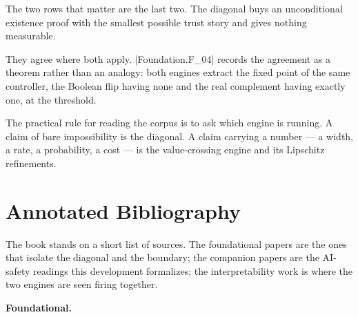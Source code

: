 \documentclass{memoir}
\begin{document}
The two rows that matter are the last two. The diagonal buys an unconditional
existence proof with the smallest possible trust story and gives nothing measurable.

They agree where both apply. \LeanVerb|Foundation.F_04| records the agreement as a theorem
rather than an analogy: both engines extract the fixed point of the same controller,
the Boolean flip having none and the real complement having exactly one, at the
threshold.

The practical rule for reading the corpus is to ask which engine is running. A claim
of bare impossibility is the diagonal. A claim carrying a number — a width, a rate,
a probability, a cost — is the value-crossing engine and its Lipschitz refinements.



\section{Annotated Bibliography}\label{Two--Schemas--of--Impossibility-005F-005F-005F--Machine--Checked--Limits--of--Trustworthy--Machine--Learning-005F-005F-005F--and--Why--They--Tighten--with--Capability----Appendices----Annotated--Bibliography}

The book stands on a short list of sources. The foundational papers are the ones
that isolate the diagonal and the boundary; the companion papers are the AI-safety
readings this development formalizes; the interpretability work is where the two
engines are seen firing together.

\textbf{Foundational.}
\end{document}
